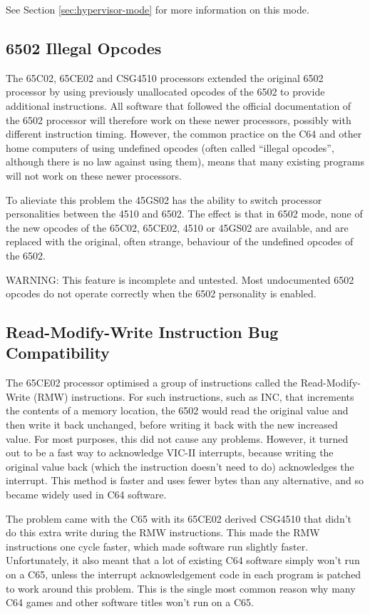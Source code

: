 See Section \ref{sec:hypervisor-mode} for more information on this mode.

\subsection{6502 Illegal Opcodes}

The 65C02, 65CE02 and CSG4510 processors extended the original 6502 processor
by using previously unallocated opcodes of the 6502 to provide additional
instructions.  All software that followed the official documentation of the 6502
processor will therefore work on these newer processors, possibly with different
instruction timing.  However, the common practice on the C64 and other home computers
of using undefined opcodes (often called ``illegal opcodes'', although there is no
law against using them), means that many existing programs will not work on these
newer processors.

To alieviate this problem the 45GS02 has the ability to switch processor personalities
between the 4510 and 6502.  The effect is that in 6502 mode, none of the new opcodes of
the 65C02, 65CE02, 4510 or 45GS02 are available, and are replaced with the original,
often strange, behaviour of the undefined opcodes of the 6502.

WARNING: This feature is incomplete and untested.  Most undocumented 6502 opcodes do not operate correctly when the 6502
personality is enabled.

\subsection{Read-Modify-Write Instruction Bug Compatibility}

The 65CE02 processor optimised a group of instructions called the Read-Modify-Write (RMW)
instructions.  For such instructions, such as INC, that increments the contents of a memory
location, the 6502 would read the original value and then write it back unchanged, before
writing it back with the new increased value.  For most purposes, this did not cause any
problems. However, it turned out to be a fast way to acknowledge VIC-II interrupts, because
writing the original value back (which the instruction doesn't need to do) acknowledges
the interrupt.  This method is faster and uses fewer bytes than any alternative, and so
became widely used in C64 software.

The problem came with the C65 with its 65CE02 derived CSG4510 that didn't do this extra write
during the RMW instructions.  This made the RMW instructions one cycle faster, which made
software run slightly faster. Unfortunately, it also meant that a lot of existing C64 software
simply won't run on a C65, unless the interrupt acknowledgement code in each program is patched
to work around this problem. This is the single most common reason why many C64 games and other
software titles won't run on a C65.

